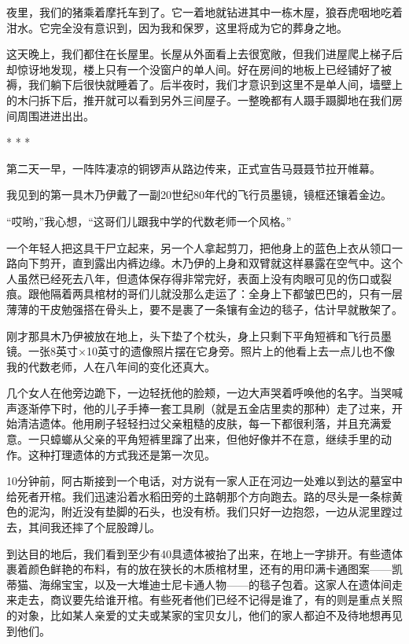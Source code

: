 \documentclass[12pt,oneside]{book}
\begin{document}
夜里，我们的猪乘着摩托车到了。它一着地就钻进其中一栋木屋，狼吞虎咽地吃着泔水。它完全没有意识到，因为我和保罗，这里将成为它的葬身之地。

这天晚上，我们都住在长屋里。长屋从外面看上去很宽敞，但我们进屋爬上梯子后却惊讶地发现，楼上只有一个没窗户的单人间。好在房间的地板上已经铺好了被褥，我们躺下后很快就睡着了。后半夜时，我们才意识到这里不是单人间，墙壁上的木闩拆下后，推开就可以看到另外三间屋子。一整晚都有人蹑手蹑脚地在我们房间周围进进出出。

\begin{center}
* * *
\end{center}

第二天一早，一阵阵凄凉的铜锣声从路边传来，正式宣告马聂聂节拉开帷幕。

我见到的第一具木乃伊戴了一副20世纪80年代的飞行员墨镜，镜框还镶着金边。

“哎哟，”我心想，“这哥们儿跟我中学的代数老师一个风格。”

一个年轻人把这具干尸立起来，另一个人拿起剪刀，把他身上的蓝色上衣从领口一路向下剪开，直到露出内裤边缘。木乃伊的上身和双臂就这样暴露在空气中。这个人虽然已经死去八年，但遗体保存得非常完好，表面上没有肉眼可见的伤口或裂痕。跟他隔着两具棺材的哥们儿就没那么走运了：全身上下都皱巴巴的，只有一层薄薄的干皮勉强搭在骨头上，要不是裹了一条镶有金边的毯子，估计早就散架了。

刚才那具木乃伊被放在地上，头下垫了个枕头，身上只剩下平角短裤和飞行员墨镜。一张8英寸×10英寸的遗像照片摆在它身旁。照片上的他看上去一点儿也不像我的代数老师，人在八年间的变化还真大。

几个女人在他旁边跪下，一边轻抚他的脸颊，一边大声哭着呼唤他的名字。当哭喊声逐渐停下时，他的儿子手捧一套工具刷（就是五金店里卖的那种）走了过来，开始清洁遗体。他用刷子轻轻扫过父亲粗糙的皮肤，每一下都很利落，并且充满爱意。一只蟑螂从父亲的平角短裤里蹿了出来，但他好像并不在意，继续手里的动作。这种打理遗体的方式我还是第一次见。

10分钟前，阿古斯接到一个电话，对方说有一家人正在河边一处难以到达的墓室中给死者开棺。我们迅速沿着水稻田旁的土路朝那个方向跑去。路的尽头是一条棕黄色的泥沟，附近没有垫脚的石头，也没有桥。我们只好一边抱怨，一边从泥里蹚过去，其间我还摔了个屁股蹲儿。

到达目的地后，我们看到至少有40具遗体被抬了出来，在地上一字排开。有些遗体裹着颜色鲜艳的布料，有的放在狭长的木质棺材里，还有的用印满卡通图案——凯蒂猫、海绵宝宝，以及一大堆迪士尼卡通人物——的毯子包着。这家人在遗体间走来走去，商议要先给谁开棺。有些死者他们已经不记得是谁了，有的则是重点关照的对象，比如某人亲爱的丈夫或某家的宝贝女儿，他们的家人都迫不及待地想再见到他们。
\end{document}
